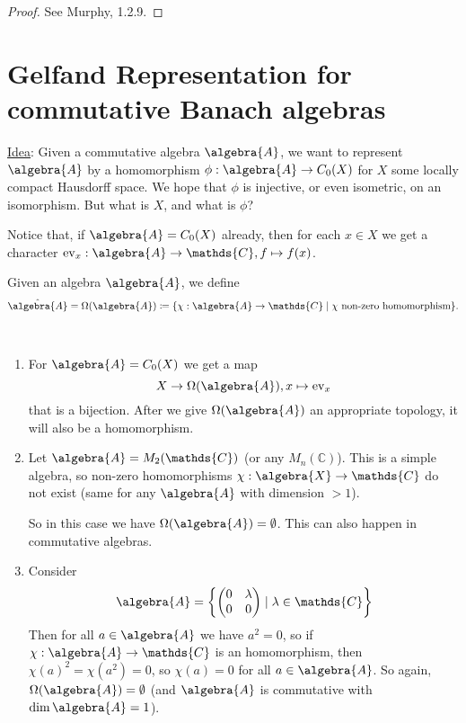 \documentclass[a4paper]{article}
\begin{document}
\begin{proof}
	See Murphy, 1.2.9.
\end{proof}


\section{Gelfand Representation for commutative Banach algebras}

\underline{Idea}: Given a commutative algebra $\algebra{A}$, we want to represent $\algebra{A}$ by a homomorphism $\phi: \algebra{A} \to C_0(X)$ for $X$ some locally compact Hausdorff space. We hope that $\phi$ is injective, or even isometric, on an isomorphism. But what is $X$, and what is $\phi$?

Notice that, if $\algebra{A} = C_0(X)$ already, then for each $x \in X$ we get a character $\mathrm{ev}_x: \algebra{A} \to \mathds{C}, f \mapsto f(x)$.

\begin{definition}
	Given an algebra $\algebra{A}$, we define
	\begin{equation*}
		\hat{\algebra{A}} = \Omega(\algebra{A}) \coloneq \{\chi: \algebra{A} \to \mathds{C} \mid \chi \text{ non-zero homomorphism}\}\text{.}
	\end{equation*}
\end{definition}

\begin{example}~
	\begin{enumerate}
		\item For $\algebra{A} = C_0(X)$ we get a map
		      \begin{equation*}
			      X \to \Omega(\algebra{A}), x \mapsto \mathrm{ev}_x
		      \end{equation*}
		      that is a bijection. After we give $\Omega(\algebra{A})$ an appropriate topology, it will also be a homomorphism.
		\item Let $\algebra{A} = M_2(\mathds{C})$ (or any $M_n(\mathds{C})$). This is a simple algebra, so non-zero homomorphisms $\chi: \algebra{X} \to \mathds{C}$ do not exist (same for any $\algebra{A}$ with dimension $>1$).

		      So in this case we have $\Omega(\algebra{A}) = \emptyset$. This can also happen in commutative algebras.
		\item Consider
		      \begin{equation*}
			      \algebra{A} = \left\{ \qmatrix{0 & \lambda \\ 0 & 0} \mid \lambda \in \mathds{C}  \right\}
		      \end{equation*}
		      Then for all $a \in \algebra{A}$ we have $a^2 = 0$, so if $\chi: \algebra{A} \to \mathds{C}$ is an homomorphism, then $\chi(a)^2 = \chi(a^2) = 0$, so $\chi(a) = 0$ for all $a \in \algebra{A}$.
		      So again, $\Omega(\algebra{A}) = \emptyset$ (and $\algebra{A}$ is commutative with $\dim \algebra{A} = 1$).
	\end{enumerate}
\end{example}
\end{document}
